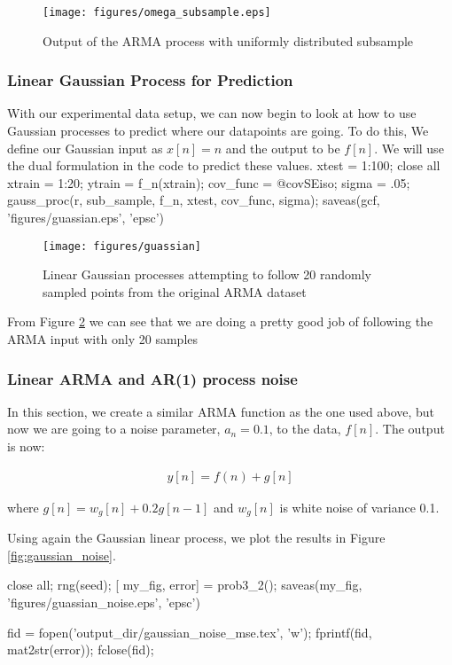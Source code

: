 \documentclass[11pt, twoside]{article}   	%
\newenvironment{matlab}{\comment}{\endcomment}
\begin{document}
\begin{figure}[h]
\centering
\texttt{[image: figures/omega\_subsample.eps]}
\caption{Output of the ARMA process with uniformly distributed subsample}
\label{fig:omega_subsample} 
\end{figure}
\FloatBarrier

\subsubsection{Linear Gaussian Process for Prediction}
With our experimental data setup, we can now begin to look at how to use
Gaussian processes to predict where our datapoints are going. To do this, 
We define our Gaussian input as $x[n] = n$ and the output to be $f[n]$. 
We will use the dual formulation in the code to predict these values.  
\begin{matlab}
xtest = 1:100;
close all
xtrain = 1:20; 
ytrain = f_n(xtrain); 
cov_func = @covSEiso;
sigma = .05; 
gauss_proc(r, sub_sample, f_n, xtest, cov_func, sigma);
saveas(gcf, 'figures/guassian.eps', 'epsc')
\end{matlab}

\begin{figure}[h]
\centering
\texttt{[image: figures/guassian]}
\caption{Linear Gaussian processes attempting to follow 20 randomly sampled points 
from the original ARMA dataset}
\label{fig:gaussian} 
\end{figure}
\FloatBarrier

From Figure \ref{fig:gaussian} we can see that we are doing a pretty good
job of following the ARMA input with only 20 samples 


\subsubsection{Linear ARMA and AR(1) process noise}
In this section, we create a similar ARMA function as the one used above, but now we are 
going to a noise parameter, $a_n = 0.1$, to the data, $f[n]$.  The output is now: 

\begin{align}
y[n] = f(n) + g[n]
\end{align}

where $g[n] = w_g[n] + 0.2g[n-1]$ and $w_g[n]$ is white noise of variance 0.1. 

Using again the Gaussian linear process, we plot the results in Figure
\ref{fig:gaussian_noise}. 

\begin{matlab}
close all; 
rng(seed); 
[ my_fig, error] = prob3_2();
saveas(my_fig, 'figures/guassian_noise.eps', 'epsc')

fid = fopen('output_dir/gaussian_noise_mse.tex', 'w'); 
fprintf(fid, mat2str(error)); 
fclose(fid); 
\end{matlab}
\end{document}

